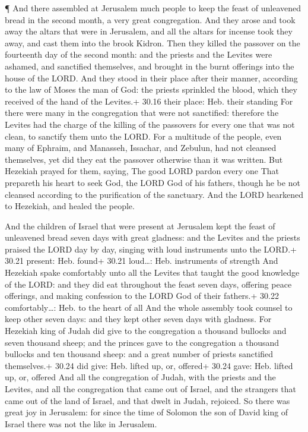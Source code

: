  ¶ And there assembled at Jerusalem much people to keep the
feast of unleavened bread in the second month, a very great
congregation.  And they arose and took away the altars that
were in Jerusalem, and all the altars for incense took they away, and
cast them into the brook Kidron.  Then they killed the
passover on the fourteenth day of the second month: and the priests and
the Levites were ashamed, and sanctified themselves, and brought in the
burnt offerings into the house of the LORD.  And they stood
in their place after their manner, according to the law of Moses the man
of God: the priests sprinkled the blood, which they received of the hand
of the Levites.+ 30.16 their place: Heb. their standing 
For there were many in the congregation that were not sanctified:
therefore the Levites had the charge of the killing of the passovers for
every one that was not clean, to sanctify them unto the LORD.
 For a multitude of the people, even many of Ephraim, and
Manasseh, Issachar, and Zebulun, had not cleansed themselves, yet did
they eat the passover otherwise than it was written. But Hezekiah prayed
for them, saying, The good LORD pardon every one  That
prepareth his heart to seek God, the LORD God of his fathers, though he
be not cleansed according to the purification of the sanctuary.
 And the LORD hearkened to Hezekiah, and healed the people.

 And the children of Israel that were present at Jerusalem
kept the feast of unleavened bread seven days with great gladness: and
the Levites and the priests praised the LORD day by day, singing with
loud instruments unto the LORD.+ 30.21 present: Heb. found+ 30.21
loud\ldots: Heb. instruments of strength  And Hezekiah
spake comfortably unto all the Levites that taught the good knowledge of
the LORD: and they did eat throughout the feast seven days, offering
peace offerings, and making confession to the LORD God of their
fathers.+ 30.22 comfortably\ldots: Heb. to the heart of all
 And the whole assembly took counsel to keep other seven
days: and they kept other seven days with gladness.  For
Hezekiah king of Judah did give to the congregation a thousand bullocks
and seven thousand sheep; and the princes gave to the congregation a
thousand bullocks and ten thousand sheep: and a great number of priests
sanctified themselves.+ 30.24 did give: Heb. lifted up, or, offered+
30.24 gave: Heb. lifted up, or, offered  And all the
congregation of Judah, with the priests and the Levites, and all the
congregation that came out of Israel, and the strangers that came out of
the land of Israel, and that dwelt in Judah, rejoiced.  So
there was great joy in Jerusalem: for since the time of Solomon the son
of David king of Israel there was not the like in Jerusalem.

